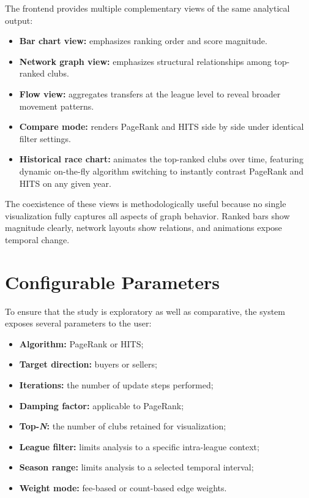 The frontend provides multiple complementary views of the same analytical output:
\begin{itemize}
    \item \textbf{Bar chart view:} emphasizes ranking order and score magnitude.
    \item \textbf{Network graph view:} emphasizes structural relationships among top-ranked clubs.
    \item \textbf{Flow view:} aggregates transfers at the league level to reveal broader movement patterns.
    \item \textbf{Compare mode:} renders PageRank and HITS side by side under identical filter settings.
    \item \textbf{Historical race chart:} animates the top-ranked clubs over time, featuring dynamic on-the-fly algorithm switching to instantly contrast PageRank and HITS on any given year.
\end{itemize}

The coexistence of these views is methodologically useful because no single visualization fully captures all aspects of graph behavior. Ranked bars show magnitude clearly, network layouts show relations, and animations expose temporal change.


\section{Configurable Parameters}
\label{sec:configurable_params}

To ensure that the study is exploratory as well as comparative, the system exposes several parameters to the user:

\begin{itemize}
    \item \textbf{Algorithm:} PageRank or HITS;
    \item \textbf{Target direction:} buyers or sellers;
    \item \textbf{Iterations:} the number of update steps performed;
    \item \textbf{Damping factor:} applicable to PageRank;
    \item \textbf{Top-\emph{N}:} the number of clubs retained for visualization;
    \item \textbf{League filter:} limits analysis to a specific intra-league context;
    \item \textbf{Season range:} limits analysis to a selected temporal interval;
    \item \textbf{Weight mode:} fee-based or count-based edge weights.
\end{itemize}

